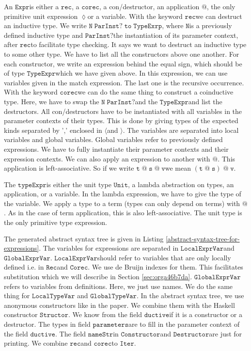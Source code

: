 \documentclass[a4paper,cleardoubleempty,BCOR1cm]{scrbook}
\begin{document}
An $\mathtt{Expr}$\;is either a $\mathtt{rec}$, a $\mathtt{corec}$, a con/destructor, an application
$\mathtt{@}$, the only primitive unit expression $\mathtt{\lozenge}$\;or a variable. With the
keyword $\mathtt{rec}$\;we can destruct an inductive type. We write
$\mathtt{N\;ParInst?\;to\;TypeExrp}$, where $\mathtt{N}$\;is a previously defined inductive type
and $\mathtt{ParInst?}$\;the instantiation of its parameter context, after $\mathtt{rec}$\;to
facilitate type checking. It says we want to destruct an inductive type to
some other type. We have to list all the constructors above one another.
For each constructor, we write an expression behind the equal sign, which
should be of type $\mathtt{TypeExpr}$\;which we have given above. In this expression,
we can use variables given in the match expression. The last one is the
recursive occurrence. With the keyword $\mathtt{corec}$\;we can do the same thing to
construct a coinductive type. Here, we have to swap the $\mathtt{N\;ParInst?}$\;and the
$\mathtt{TypeExpr}$\;and list the destructors. All con/destructors have to be
instantiated with all variables in the parameter contexts of their types.
This is done by giving types of the expected kinds separated by ',' enclosed
in $\mathtt{\langle}$\;and $\mathtt{\rangle}$. The variables are separated into local variables
and global variables. Global variables refer to previously defined
expressions. We have to fully instantiate their parameter contexts and their
expression contexts. We can also apply an expression to another with $\mathtt{@}$.
This application is left-associative.  So if we write $\mathtt{t\;@\;s\;@\;v}$\;we mean
$\mathtt{(t\;@\;s)\;@\;v}$.

The $\mathtt{typeExpr}$\;is either the unit type $\mathtt{Unit}$, a lambda abstraction on
types, an application, or a variable. In the lambda expression, we have to
give the type of the variable. We apply a type to a term (types can only
depend on terms) with $\mathtt{@}$.  As in the case of term application, this is
also left-associative.  The unit type is the only primitive type
expression.

The generated abstract syntax tree is given in Listing
\ref{abstract-syntax-tree-for-expressions}. The variables for expressions are
separated in $\mathtt{LocalExprVar}$\;and $\mathtt{GlobalExprVar}$. $\mathtt{LocalExprVar}$\;should refer
to variables that are only locally defined i.e. in $\mathtt{Rec}$\;and $\mathtt{Corec}$. We
use de Bruijn indexes for them. This facilitates substitution which we will
describe in Section \ref{sec:orga46b7da}. $\mathtt{GlobalExprVar}$\;refers to variables from
definitions. Here, we just use names. We do the same thing for $\mathtt{LocalTypeVar}$
and $\mathtt{GlobalTypeVar}$. In the abstract syntax tree, we use anonymous
constructors like in the paper. We combine them with the Haskell constructor
$\mathtt{Structor}$. We know from the field $\mathtt{ductive}$\;if it is a constructor or a
destructor. The types in field $\mathtt{parameters}$\;are to fill in the parameter
context of the field $\mathtt{ductive}$. The field $\mathtt{nameStr}$\;in $\mathtt{Constructor}$\;and
$\mathtt{Destructor}$\;are just for printing. We combine $\mathtt{rec}$\;and $\mathtt{corec}$\;to $\mathtt{Iter}$.
\end{document}
